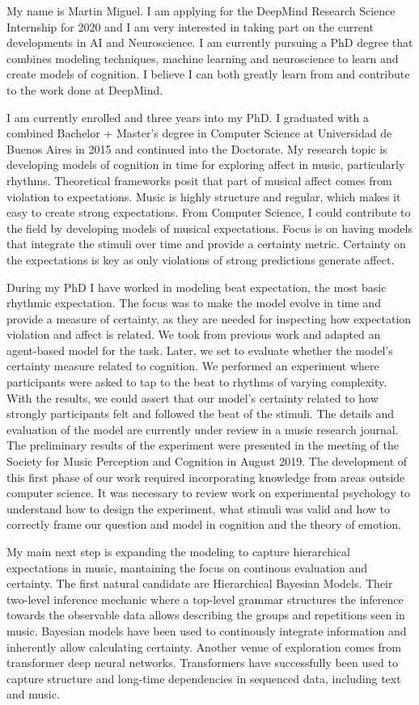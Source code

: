 My name is Martin Miguel. I am applying for the DeepMind Research Science
Internship for 2020 and I am very interested in taking part on the current
developments in AI and Neuroscience. I am currently pursuing a PhD degree that
combines modeling techniques, machine learning and neuroscience to learn and
create models of cognition. I believe I can both greatly learn from and
contribute to the work done at DeepMind.

I am currently enrolled and three years into my PhD. I graduated with a
combined Bachelor + Master's degree in Computer Science at Universidad de
Buenos Aires in 2015 and continued into the Doctorate. My research topic is
developing models of cognition in time for exploring affect in music,
particularly rhythms. Theoretical frameworks posit that part of musical affect
comes from violation to expectations. Music is highly structure and regular,
which makes it easy to create strong expectations. From Computer Science, I
could contribute to the field by developing models of musical expectations.
Focus is on having models that integrate the stimuli over time and provide a
certainty metric. Certainty on the expectations is key as only violations of
strong predictions generate affect.

During my PhD I have worked in modeling beat expectation, the most basic
rhythmic expectation. The focus was to make the model evolve in time and
provide a measure of certainty, as they are needed for inspecting how
expectation violation and affect is related. We took from previous work and
adapted an agent-based model for the task. Later, we set to evaluate whether
the model's certainty measure related to cognition. We performed an experiment
where participants were asked to tap to the beat to rhythms of varying
complexity. With the results, we could assert that our model's certainty
related to how strongly participants felt and followed the beat of the stimuli.
The details and evaluation of the model are currently under review in a music
research journal. The preliminary results of the experiment were presented in
the meeting of the Society for Music Perception and Cognition in August 2019.
The development of this first phase of our work required incorporating
knowledge from areas outside computer science. It was necessary to review work
on experimental psychology to understand how to design the experiment, what
stimuli was valid and how to correctly frame our question and model in
cognition and the theory of emotion.

My main next step is expanding the modeling to capture hierarchical
expectations in music, mantaining the focus on continous evaluation and
certainty. The first natural candidate are Hierarchical Bayesian Models. Their 
two-level inference mechanic where a top-level grammar structures the inference
towards the observable data allows describing the groups and repetitions seen
in music. Bayesian models have been used to continously integrate information
and inherently allow calculating certainty. Another venue of exploration comes
from transformer deep neural networks. Transformers have successfully been used
to capture structure and long-time dependencies in sequenced data, including
text and music. 

